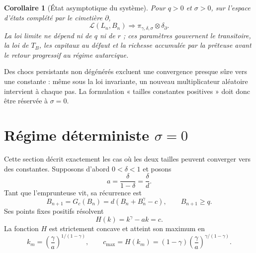 \documentclass[11pt,a4paper]{article}
\newcommand{\1}{\mathbf 1}
\newcommand{\Law}{\mathcal L}
\newtheorem{corollary}[theorem]{Corollaire}
\theoremstyle{definition}
\theoremstyle{remark}
\begin{document}
\begin{corollary}[État asymptotique du système]
Pour $q>0$ et $\sigma>0$, sur l'espace d'états complété par le cimetière
$\partial$,
\begin{equation}
\Law(L_n,B_n)\Longrightarrow
\pi_{\gamma,\delta,\sigma}\otimes\delta_{\partial}.
\label{eq:system-limit}
\end{equation}
La loi limite ne dépend ni de $q$ ni de $r$ ; ces paramètres gouvernent le
transitoire, la loi de $T_B$, les capitaux au défaut et la richesse
accumulée par la prêteuse avant le retour progressif au régime autarcique.
\end{corollary}

Des chocs persistants non dégénérés excluent une convergence presque sûre
vers une constante : même sous la loi invariante, un nouveau multiplicateur
aléatoire intervient à chaque pas. La formulation « tailles constantes
positives » doit donc être réservée à $\sigma=0$.

\section{Régime déterministe \texorpdfstring{$\sigma=0$}{sigma = 0}}

Cette section décrit exactement les cas où les deux tailles peuvent
converger vers des constantes. Supposons d'abord $0<\delta<1$ et posons
\begin{equation}
a=\frac{\delta}{1-\delta}=\frac\delta d.
\label{eq:a}
\end{equation}
Tant que l'emprunteuse vit, sa récurrence est
\begin{equation}
B_{n+1}=G_c(B_n)=d(B_n+B_n^\gamma-c),
\qquad B_{n+1}\geq q.
\label{eq:det-borrower}
\end{equation}
Ses points fixes positifs résolvent
\begin{equation}
H(k)=k^\gamma-ak=c.
\label{eq:H}
\end{equation}
La fonction $H$ est strictement concave et atteint son maximum en
\begin{equation}
k_m=\left(\frac\gamma a\right)^{1/(1-\gamma)},
\qquad
c_{\max}=H(k_m)
=(1-\gamma)\left(\frac\gamma a\right)^{\gamma/(1-\gamma)}.
\label{eq:cmax}
\end{equation}
\end{document}
